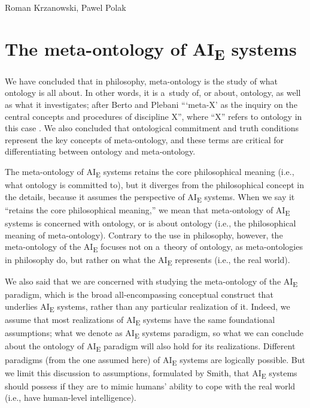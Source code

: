 \begin{artengenv2auth}{Roman Krzanowski, Pawel Polak}
\section*{The meta-ontology of AI\textsubscript{E} systems}
We have concluded that in philosophy, meta-ontology is the study of what ontology is all about. In other words, it is a~study of, or about, ontology, as well as what it investigates; after Berto and Plebani ``‘meta-X' as the inquiry on the central concepts and procedures of discipline X'', where ``X'' refers to ontology in this case
\parencite[][p.13]{berto_ontology_2015}. %
 We also concluded that ontological commitment and truth conditions represent the key concepts of meta-ontology, and these terms are critical for differentiating between ontology and meta-ontology.

The meta-ontology of AI\textsubscript{E} systems retains the core philosophical meaning (i.e., what ontology is committed to), but it diverges from the philosophical concept in the details, because it assumes the perspective of AI\textsubscript{E} systems. When we say it ``retains the core philosophical meaning,'' we mean that meta-ontology of AI\textsubscript{E} systems is concerned with ontology, or is about ontology (i.e., the philosophical meaning of meta-ontology). Contrary to the use in philosophy, however, the meta-ontology of the AI\textsubscript{E} focuses not on a~theory of ontology, as meta-ontologies in philosophy do, but rather on what the AI\textsubscript{E} represents (i.e., the real world).

We also said that we are concerned with studying the meta-ontology of the AI\textsubscript{E} paradigm, which is the broad all-encompassing conceptual construct that underlies AI\textsubscript{E} systems, rather than any particular realization of it. Indeed, we assume that most realizations of AI\textsubscript{E} systems have the same foundational assumptions; what we denote as AI\textsubscript{E} systems paradigm, so what we can conclude about the ontology of AI\textsubscript{E} paradigm will also hold for its realizations. Different paradigms (from the one assumed here) of AI\textsubscript{E} systems are logically possible. But we limit this discussion to assumptions, formulated by Smith, that AI\textsubscript{E} systems should possess if they are to mimic humans' ability to cope with the real world (i.e., have human-level intelligence).


\end{artengenv2auth}
